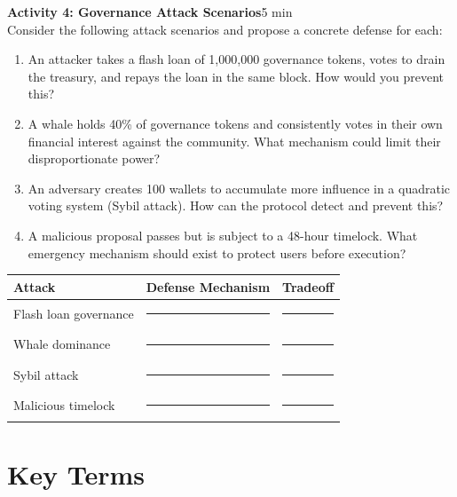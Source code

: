 \documentclass[11pt,a4paper]{article}
\newcommand{\activitybox}[3]{%
  \noindent\colorbox{mllavender4}{\parbox{\dimexpr\linewidth-2\fboxsep}{%
    \textbf{\color{mlpurple}#1}\hfill\textcolor{mlgray}{\small #2}\\[2pt]#3%
  }}\par\vspace{4pt}%
}
\newcommand{\fillcell}{\rule{2.2cm}{0.3pt}}
\begin{document}
\vspace{2pt}

\activitybox{Activity 4: Governance Attack Scenarios}{5 min}{%
Consider the following attack scenarios and propose a concrete defense for each:
\begin{enumerate}
\item An attacker takes a flash loan of 1{,}000{,}000 governance tokens, votes to drain the treasury, and repays the loan in the same block. How would you prevent this?
\item A whale holds 40\% of governance tokens and consistently votes in their own financial interest against the community. What mechanism could limit their disproportionate power?
\item An adversary creates 100 wallets to accumulate more influence in a quadratic voting system (Sybil attack). How can the protocol detect and prevent this?
\item A malicious proposal passes but is subject to a 48-hour timelock. What emergency mechanism should exist to protect users before execution?
\end{enumerate}
\vspace{4pt}
{\footnotesize\renewcommand{\arraystretch}{1.35}%
\setlength{\tabcolsep}{5pt}%
\begin{tabular}{@{}p{3.2cm}p{4.8cm}p{4.8cm}@{}}
\toprule
\textbf{Attack} & \textbf{Defense Mechanism} & \textbf{Tradeoff} \\
\midrule
Flash loan governance & \fillcell & \fillcell \\
Whale dominance       & \fillcell & \fillcell \\
Sybil attack          & \fillcell & \fillcell \\
Malicious timelock    & \fillcell & \fillcell \\
\bottomrule
\end{tabular}}
\vspace{2pt}
}

\vspace{4pt}

\section{Key Terms}
\end{document}
